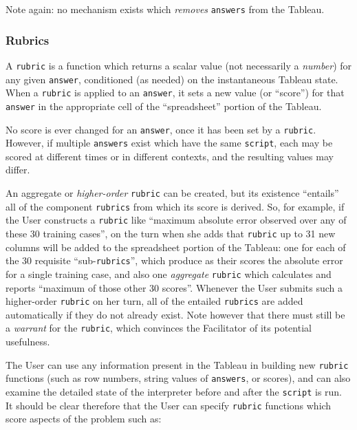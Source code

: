 Note again: no mechanism exists which \emph{removes} {\tt answers} from the Tableau.

\subsubsection{Rubrics}\hypertarget{rubrics}{}\label{rubrics}

A {\tt rubric} is a function which returns a scalar value (not necessarily a \emph{number}) for any given {\tt answer}, conditioned (as needed) on the instantaneous Tableau state. When a {\tt rubric} is applied to an {\tt answer}, it sets a new value (or ``score'') for that {\tt answer} in the appropriate cell of the ``spreadsheet'' portion of the Tableau.

No score is ever changed for an {\tt answer}, once it has been set by a {\tt rubric}. However, if multiple {\tt answers} exist which have the same {\tt script}, each may be scored at different times or in different contexts, and the resulting values may differ.

An aggregate or \emph{higher-order} {\tt rubric} can be created, but its existence ``entails'' all of the component {\tt rubrics} from which its score is derived. So, for example, if the User constructs a {\tt rubric} like ``maximum absolute error observed over any of these 30 training cases'', on the turn when she adds that {\tt rubric} up to 31 new columns will be added to the spreadsheet portion of the Tableau: one for each of the 30 requisite ``sub-{\tt rubrics}'', which produce as their scores the absolute error for a single training case, and also one \emph{aggregate} {\tt rubric} which calculates and reports ``maximum of those other 30 scores''. Whenever the User submits such a higher-order {\tt rubric} on her turn, all of the entailed {\tt rubrics} are added automatically if they do not already exist. Note however that there must still be a \emph{warrant} for the {\tt rubric}, which convinces the Facilitator of its potential usefulness.

The User can use any information present in the Tableau in building new {\tt rubric} functions (such as row numbers, string values of {\tt answers}, or scores), and can also examine the detailed state of the interpreter before and after the {\tt script} is run. It should be clear therefore that the User can specify {\tt rubric} functions which score aspects of the problem such as:

